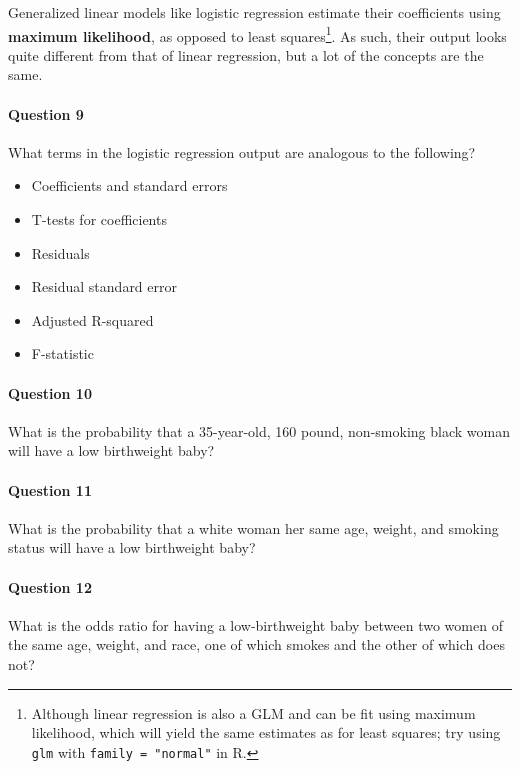 Generalized linear models like logistic regression estimate their coefficients using \textbf{maximum likelihood}, as opposed to least squares\footnote{Although linear regression is also a GLM and can be fit using maximum likelihood, which will yield the same estimates as for least squares; try using \texttt{glm} with \texttt{family = "normal"} in R.}. As such, their output looks quite different from that of linear regression, but a lot of the concepts are the same.

\paragraph{Question 9} What terms in the logistic regression output are analogous to the following?
\begin{itemize}
\item Coefficients and standard errors
\item T-tests for coefficients
\item Residuals
\item Residual standard error
\item Adjusted R-squared
\item F-statistic
\end{itemize}

\paragraph{Question 10} What is the probability that a 35-year-old, 160 pound, non-smoking black woman will have a low birthweight baby?

\vspace{50mm}

\paragraph{Question 11} What is the probability that a white woman her same age, weight, and smoking status will have a low birthweight baby?

\vspace{50mm}

\paragraph{Question 12} What is the odds ratio for having a low-birthweight baby between two women of the same age, weight, and race, one of which smokes and the other of which does not?

\vspace{40mm}

